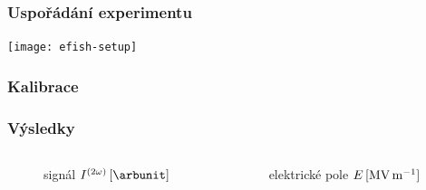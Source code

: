 \documentclass[10pt]{beamer}
\begin{document}
\begin{frame}
	\frametitle{Uspořádání experimentu}
	\texttt{[image: efish-setup]}
\end{frame}

\begin{frame}
	\frametitle{Kalibrace}
	\graphicspath{{../efish/}}
	
\end{frame}

\begin{frame}
	\frametitle{Výsledky}
	\begin{columns}
	\begin{column}{0.5\textwidth}
		\begin{figure}
			\centering
			\small
			signál \EFISH{} $\efish\,[\si{\arbunit}]$
			\medskip\par
			\graphicspath{{../efish/}}
			
		\end{figure}
	\end{column}
	\begin{column}{0.5\textwidth}
		\begin{figure}
			\centering
			\small
			elektrické pole $E\,[\si{\mega\volt\per\metre}]$
			\medskip\par
			\graphicspath{{../efish/}}
			
		\end{figure}
	\end{column}
	\end{columns}
\end{frame}
\end{document}
